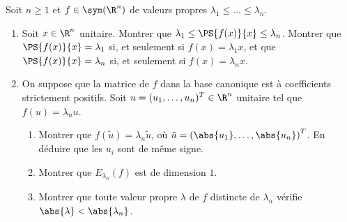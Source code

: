 \begin{enonce}
\begin{exercise}[ID={RMS133 E1025},subtitle={Centrale MP 2022},tags={},difficulty={}]
  Soit $n\geq 1$ et $f\in\sym(\R^n)$ de valeurs propres $\lambda_1\leq\dots\leq\lambda_n$.
  \begin{enumerate}
    \item Soit $x\in\R^n$ unitaire.
      Montrer que $\lambda_1\leq \PS{f(x)}{x} \leq \lambda_n$.
      Montrer que $\PS{f(x)}{x}=\lambda_1$ si, et seulement si $f(x)=\lambda_1 x$,
      et que $\PS{f(x)}{x}=\lambda_n$ si, et seulement si $f(x)=\lambda_n x$.

    \item On suppose que la matrice de $f$ dans la base canonique est à coefficients strictement positifs.
      Soit $u=(u_1,\dots,u_n)^T\in\R^n$ unitaire tel que $f(u)=\lambda_n u$.
      \begin{enumerate}
        \item Montrer que $f(\tilde u)=\lambda_n \tilde u$, où $\tilde{u}=\left( \abs{u_1},\dots,\abs{u_n} \right)^T$.
          En déduire que les $u_i$ sont de même signe.
        \item Montrer que $E_{\lambda_n}(f)$ est de dimension $1$.

        \item Montrer que toute valeur propre $\lambda$ de $f$ distincte de $\lambda_n$ vérifie $\abs{\lambda} < \abs{\lambda_n}$.
      \end{enumerate}
  \end{enumerate}
\end{exercise}
\begin{solution}
\end{solution}
\end{enonce}

